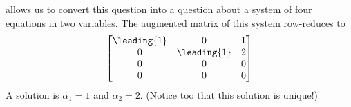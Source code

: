 %
 allows us to convert this question into a question about a system of four equations in two variables.  The augmented matrix of this system row-reduces to 
%
\begin{equation*}
\begin{bmatrix}
 \leading{1} & 0 & 1 \\
 0 & \leading{1} & 2 \\
 0 & 0 & 0 \\
 0 & 0 & 0
\end{bmatrix}
\end{equation*}
%
A solution is $\alpha_1=1$ and $\alpha_2=2$.  (Notice too that this solution is unique!)

